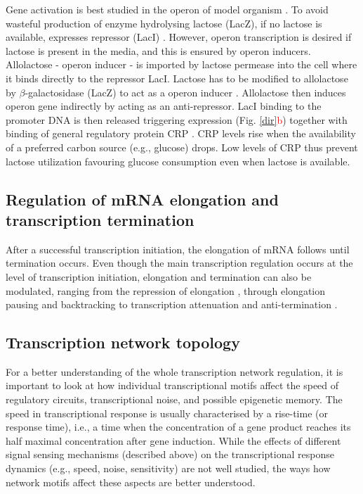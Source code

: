 Gene activation is best studied in the  operon of model organism .
To avoid wasteful production of enzyme hydrolysing lactose (LacZ), if no lactose is available,  expresses  repressor (LacI) \cite{hudson1990co}.
However,  operon transcription is desired if lactose is present in the media, and this is ensured by  operon inducers.
Allolactose -  operon inducer - is imported by lactose permease into the cell where it binds directly to the repressor LacI.
Lactose has to be modified to allolactose by $\beta$-galactosidase (LacZ) to act as a  operon inducer \cite{jobe1972lac, wheatley2013structural}.
Allolactose then induces  operon gene indirectly by acting as an anti-repressor.
LacI binding to the promoter DNA is then released triggering  expression (Fig. \ref{dir}\textcolor{red}{b}) together with binding of general regulatory protein CRP \cite{hudson1990co, clark2005molecular}.
CRP levels rise when the availability of a preferred carbon source (e.g., glucose) drops.
Low levels of CRP thus prevent lactose utilization favouring glucose consumption even when lactose is available.

\subsection{Regulation of mRNA elongation and transcription termination}
After a successful transcription initiation, the elongation of mRNA follows until termination occurs.
Even though the main transcription regulation occurs at the level of transcription initiation, elongation and termination can also be modulated, ranging from the repression of elongation \cite{monsalve1996protein}, through elongation pausing and backtracking \cite{mustaev2017transcription} to transcription attenuation and anti-termination \cite{naville2009transcription}.

\subsection{Transcription network topology}
For a better understanding of the whole transcription network regulation, it is important to look at how individual transcriptional motifs affect the speed of regulatory circuits, transcriptional noise, and possible epigenetic memory.
The speed in transcriptional response is usually characterised by a rise-time (or response time), i.e., a time when the concentration of a gene product reaches its half maximal concentration after gene induction.
While the effects of different signal sensing mechanisms (described above) on the transcriptional response dynamics (e.g., speed, noise, sensitivity) are not well studied, the ways how network motifs affect these aspects are better understood.

